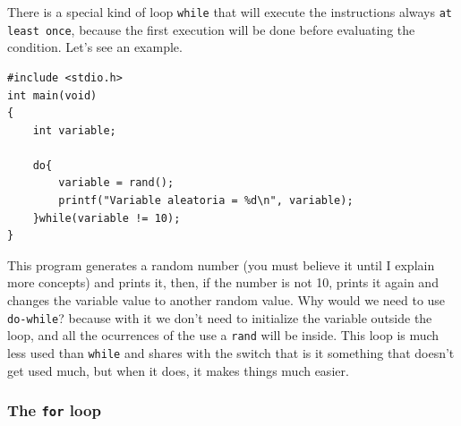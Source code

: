 \documentclass[a4paper]{article}
\begin{document}
There is a special kind of loop \texttt{while} that will execute the
instructions always \texttt{at least once}, because the first execution will be
done before evaluating the condition. Let's see an example.

\noindent
\begin{minipage}[H]{\linewidth}
\mbox{}
\begin{lstlisting}[style=C,
caption={Ejemplo de programa con un bucle \texttt{do-while}},
label={lst:doWhile}]
#include <stdio.h>
int main(void)
{
    int variable;

    do{
        variable = rand();
        printf("Variable aleatoria = %d\n", variable);
    }while(variable != 10);
}
\end{lstlisting}
\end{minipage}

This program generates a random number (you must believe it until I explain more
concepts) and prints it, then, if the number is not 10, prints it again and
changes the variable value to another random value. Why would we need to use
\texttt{do-while}? because with it we don't need to initialize the variable
outside the loop, and all the ocurrences of the use a \texttt{rand} will be
inside. This loop is much less used than \texttt{while} and shares with the
switch that is it something that doesn't get used much, but when it does,
it makes things much easier.

\subsubsection{The \texttt{for} loop}
\end{document}
